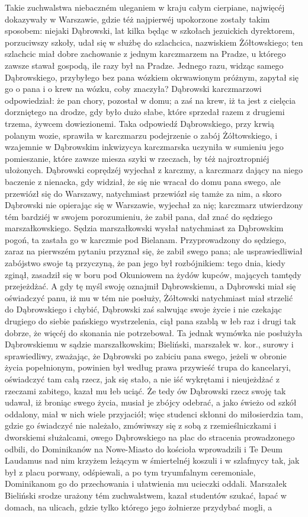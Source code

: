 \documentclass{book}
\begin{document}
Takie zuchwalstwa niebaczném uleganiem w kraju całym cierpiane, najwięcéj dokazywały w Warszawie, gdzie téż najpierwéj upokorzone zostały takim sposobem: niejaki Dąbrowski, lat kilka będąc w szkołach jezuickich dyrektorem, porzuciwszy szkoły, udał się w służbę do szlachcica, nazwiskiem Żółtowskiego; ten szlachcic miał dobre zachowanie z jednym karczmarzem na Pradze, u którego zawsze stawał gospodą, ile razy był na Pradze. Jednego razu, widząc samego Dąbrowskiego, przybyłego bez pana wózkiem okrwawionym próżnym, zapytał się go o pana i o krew na wózku, coby znaczyła? Dąbrowski karczmarzowi odpowiedział: że pan chory, pozostał w domu; a zaś na krew, iż ta jest z cielęcia dorzniętego na drodze, gdy było dużo słabe, które sprzedał razem z drugiemi trzema, żywcem dowiezionemi. Taka odpowiedź Dąbrowskiego, przy krwią polanym wozie, sprawiła w karczmarzu podejrzenie o zabój Żółtowskiego, i wzajemnie w Dąbrowskim inkwizycya karczmarska uczyniła w sumieniu jego pomieszanie, które zawsze miesza szyki w rzeczach, by téż najroztropniéj ułożonych. Dąbrowski coprędzéj wyjechał z karczmy, a karczmarz dający na niego baczenie z nienacka, gdy widział, że się nie wracał do domu pana swego, ale przewiózł się do Warszawy, natychmiast przewiózł się tamże za nim, a skoro Dąbrowski nie opierając się w Warszawie, wyjechał za nię; karczmarz utwierdzony tém bardziéj w swojem porozumieniu, że zabił pana, dał znać do sędziego marszałkowskiego. Sędzia marszałkowski wysłał natychmiast za Dąbrowskim pogoń, ta zastała go w karczmie pod Bielanam. Przyprowadzony do sędziego, zaraz na pierwszém pytaniu przyznał się, że zabił swego pana; ale usprawiedliwiał zabójstwo swoje tą przyczyną, że pan jego był rozbójnikiem: tego dnia, kiedy zginął, zasadził się w boru pod Okuniowem na żydów kupców, mających tamtędy przejeżdżać. A gdy tę myśl swoję oznajmił Dąbrowskiemu, a Dąbrowski miał się oświadczyć panu, iż mu w tém nie posłuży, Żółtowski natychmiast miał strzelić do Dąbrowskiego i chybić, Dąbrowski zaś salwując swoje życie i nie czekając drugiego do siebie pańskiego wystrzelenia, ciął pana szablą w łeb raz i drugi tak dobrze, że więcéj do skonania nie potrzebował. Ta jednak wymówka nie posłużyła Dąbrowskiemu w sądzie marszałkowskim; Bieliński, marszałek w. kor., surowy i sprawiedliwy, zważając, że Dąbrowski po zabiciu pana swego, jeżeli w obronie życia popełnionym, powinien był według prawa przywieść trupa do kancelaryi, oświadczyć tam całą rzecz, jak się stało, a nie iść wykrętami i nieujeżdżać z rzeczami zabitego, kazał mu łeb uciąć. Że tedy ów Dąbrowski rzecz swoję tak udawał, iż broniąc swego życia, musiał je zbójcy odebrać, a jako świeżo od szkół oddalony, miał w nich wiele przyjaciół; więc studenci skłonni do miłosierdzia tam, gdzie go świadczyć nie należało, zmówiwszy się z sobą z rzemieślniczkami i dworskiemi służalcami, owego Dąbrowskiego na plac do stracenia prowadzonego odbili, do Dominikanów na Nowe-Miasto do kościoła wprowadzili i Te Deum Laudamus nad nim krzyżem leżącym w śmiertelnéj koszuli i w szlafmycy tak, jak był z placu porwany, odśpiewali, a po tym tryumfalnym ceremoniale, Dominikanom go do przechowania i ułatwienia mu ucieczki oddali. Marszałek Bieliński srodze urażony tém zuchwalstwem, kazał studentów szukać, łapać w domach, na ulicach, gdzie tylko którego jego żołnierze przydybać mogli, a 
\end{document}

